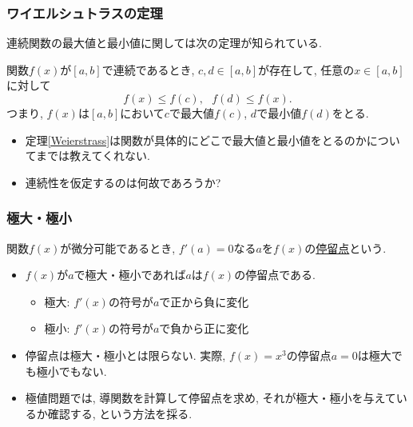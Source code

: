 


\begin{frame}
\frametitle{ワイエルシュトラスの定理}



連続関数の最大値と最小値に関しては次の定理が知られている. 

\begin{Thm}[ワイエルシュトラスの定理] \label{Weierstrass}
関数$f(x)$が$[a,b]$で連続であるとき, $c,d\in [a,b]$が存在して, 任意の$x \in [a,b]$に対して
$$
f(x) \le f(c), \ \ \ f(d) \le f(x). 
$$
つまり, $f(x)$は$[a,b]$において$c$で最大値$f(c)$, $d$で最小値$f(d)$をとる. 
\end{Thm}
\begin{itemize}
\item 定理\ref{Weierstrass}は関数が具体的にどこで最大値と最小値をとるのかについてまでは教えてくれない. 
\item 連続性を仮定するのは何故であろうか? 
\end{itemize}
\end{frame}




\begin{frame}
\frametitle{極大・極小}


\begin{Def}
関数$f(x)$が微分可能であるとき, $f'(a)=0$なる$a$を$f(x)$の\underline{停留点}という. 
\end{Def}

\begin{itemize}
\item $f(x)$が$a$で極大・極小であれば$a$は$f(x)$の停留点である. 
\begin{itemize}
\item 極大: $f'(x)$の符号が$a$で正から負に変化
\item 極小: $f'(x)$の符号が$a$で負から正に変化
\end{itemize}
\item 停留点は極大・極小とは限らない. 実際, $f(x)=x^3$の停留点$a=0$は極大でも極小でもない. 
\item 極値問題では, 導関数を計算して停留点を求め, それが極大・極小を与えているか確認する, という方法を採る. 
\end{itemize}
\end{frame}



